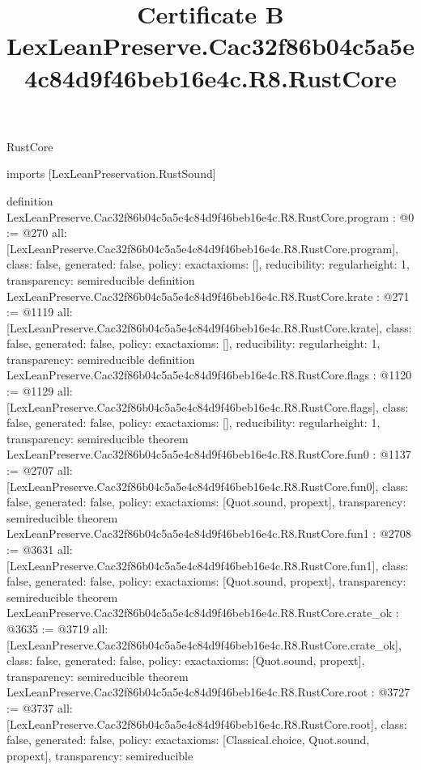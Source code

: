 \begin{lexlean}{RustCore}
\title{Certificate B LexLeanPreserve.Cac32f86b04c5a5e4c84d9f46beb16e4c.R8.RustCore}
\begin{coremodule}
imports [LexLeanPreservation.RustSound]

definition LexLeanPreserve.Cac32f86b04c5a5e4c84d9f46beb16e4c.R8.RustCore.program : @0 := @270 {
  all: [LexLeanPreserve.Cac32f86b04c5a5e4c84d9f46beb16e4c.R8.RustCore.program],
  class: false,
  generated: false,
  policy: exact{axioms: []},
  reducibility: regular{height: 1},
  transparency: semireducible
}
definition LexLeanPreserve.Cac32f86b04c5a5e4c84d9f46beb16e4c.R8.RustCore.krate : @271 := @1119 {
  all: [LexLeanPreserve.Cac32f86b04c5a5e4c84d9f46beb16e4c.R8.RustCore.krate],
  class: false,
  generated: false,
  policy: exact{axioms: []},
  reducibility: regular{height: 1},
  transparency: semireducible
}
definition LexLeanPreserve.Cac32f86b04c5a5e4c84d9f46beb16e4c.R8.RustCore.flags : @1120 := @1129 {
  all: [LexLeanPreserve.Cac32f86b04c5a5e4c84d9f46beb16e4c.R8.RustCore.flags],
  class: false,
  generated: false,
  policy: exact{axioms: []},
  reducibility: regular{height: 1},
  transparency: semireducible
}
theorem LexLeanPreserve.Cac32f86b04c5a5e4c84d9f46beb16e4c.R8.RustCore.fun0 : @1137 := @2707 {
  all: [LexLeanPreserve.Cac32f86b04c5a5e4c84d9f46beb16e4c.R8.RustCore.fun0],
  class: false,
  generated: false,
  policy: exact{axioms: [Quot.sound, propext]},
  transparency: semireducible
}
theorem LexLeanPreserve.Cac32f86b04c5a5e4c84d9f46beb16e4c.R8.RustCore.fun1 : @2708 := @3631 {
  all: [LexLeanPreserve.Cac32f86b04c5a5e4c84d9f46beb16e4c.R8.RustCore.fun1],
  class: false,
  generated: false,
  policy: exact{axioms: [Quot.sound, propext]},
  transparency: semireducible
}
theorem LexLeanPreserve.Cac32f86b04c5a5e4c84d9f46beb16e4c.R8.RustCore.crate_ok : @3635 := @3719 {
  all: [LexLeanPreserve.Cac32f86b04c5a5e4c84d9f46beb16e4c.R8.RustCore.crate_ok],
  class: false,
  generated: false,
  policy: exact{axioms: [Quot.sound, propext]},
  transparency: semireducible
}
theorem LexLeanPreserve.Cac32f86b04c5a5e4c84d9f46beb16e4c.R8.RustCore.root : @3727 := @3737 {
  all: [LexLeanPreserve.Cac32f86b04c5a5e4c84d9f46beb16e4c.R8.RustCore.root],
  class: false,
  generated: false,
  policy: exact{axioms: [Classical.choice, Quot.sound, propext]},
  transparency: semireducible
}


\end{coremodule}
\end{lexlean}
